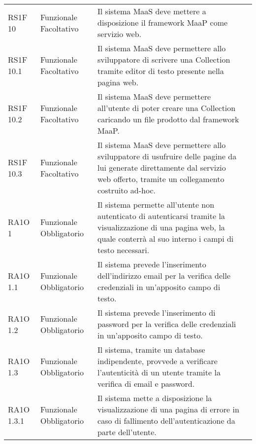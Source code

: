 \begin{center}
\begin{longtable}{ | p{2cm} | p{2cm} | p{5cm} | p{2cm} |}
 &  \\ \hline      
        RS1F 10 & Funzionale \newline  Facoltativo  & Il sistema MaaS deve mettere a disposizione il framework MaaP come servizio web. &  \\ \hline      
        RS1F 10.1 & Funzionale \newline  Facoltativo  & Il sistema MaaS deve permettere allo sviluppatore di scrivere una Collection tramite editor di testo presente nella pagina web. &  \\ \hline      
        RS1F 10.2 & Funzionale \newline  Facoltativo  & Il sistema MaaS deve permettere all'utente di poter creare una Collection caricando un file prodotto dal framework MaaP. &  \\ \hline      
        RS1F 10.3 & Funzionale \newline  Facoltativo  & Il sistema MaaS deve permettere allo sviluppatore di usufruire delle pagine da lui generate direttamente dal servizio web offerto, tramite un collegamento costruito ad-hoc. &  \\ \hline      
        RA1O 1 & Funzionale \newline  Obbligatorio  & Il sistema permette all'utente non autenticato di autenticarsi tramite la visualizzazione di una pagina web, la quale conterrà al suo interno i campi di testo necessari. &  \\ \hline      
        RA1O 1.1 & Funzionale \newline  Obbligatorio  & Il sistema prevede l'inserimento dell'indirizzo email per la verifica delle credenziali in un'apposito campo di testo. &  \\ \hline      
        RA1O 1.2 & Funzionale \newline  Obbligatorio  & Il sistema prevede l'inserimento di password per la verifica delle credenziali in un'apposito campo di testo. &  \\ \hline      
        RA1O 1.3  & Funzionale \newline  Obbligatorio  & Il sistema, tramite un database indipendente, provvede a verificare l'autenticità  di un utente tramite la verifica di email e password. &  \\ \hline      
        RA1O 1.3.1 & Funzionale \newline  Obbligatorio  & Il sistema mette a disposizione la visualizzazione di una pagina di errore in caso di fallimento dell'autenticazione da parte dell'utente.
 &  \\ \hline      

\end{longtable}
\end{center}
